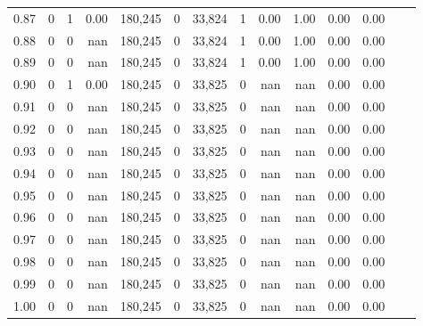 \begin{tabular}{rrrrrrrrrrrrrr}
0.87 &      0 &    1 &    0.00 &  180,245 &        0 &  33,824 &       1 &  0.00 &  1.00 &  0.00 &      0.00 \\
0.88 &      0 &    0 &     nan &  180,245 &        0 &  33,824 &       1 &  0.00 &  1.00 &  0.00 &      0.00 \\
0.89 &      0 &    0 &     nan &  180,245 &        0 &  33,824 &       1 &  0.00 &  1.00 &  0.00 &      0.00 \\
0.90 &      0 &    1 &    0.00 &  180,245 &        0 &  33,825 &       0 &   nan &   nan &  0.00 &      0.00 \\
0.91 &      0 &    0 &     nan &  180,245 &        0 &  33,825 &       0 &   nan &   nan &  0.00 &      0.00 \\
0.92 &      0 &    0 &     nan &  180,245 &        0 &  33,825 &       0 &   nan &   nan &  0.00 &      0.00 \\
0.93 &      0 &    0 &     nan &  180,245 &        0 &  33,825 &       0 &   nan &   nan &  0.00 &      0.00 \\
0.94 &      0 &    0 &     nan &  180,245 &        0 &  33,825 &       0 &   nan &   nan &  0.00 &      0.00 \\
0.95 &      0 &    0 &     nan &  180,245 &        0 &  33,825 &       0 &   nan &   nan &  0.00 &      0.00 \\
0.96 &      0 &    0 &     nan &  180,245 &        0 &  33,825 &       0 &   nan &   nan &  0.00 &      0.00 \\
0.97 &      0 &    0 &     nan &  180,245 &        0 &  33,825 &       0 &   nan &   nan &  0.00 &      0.00 \\
0.98 &      0 &    0 &     nan &  180,245 &        0 &  33,825 &       0 &   nan &   nan &  0.00 &      0.00 \\
0.99 &      0 &    0 &     nan &  180,245 &        0 &  33,825 &       0 &   nan &   nan &  0.00 &      0.00 \\
1.00 &      0 &    0 &     nan &  180,245 &        0 &  33,825 &       0 &   nan &   nan &  0.00 &      0.00 \\
\bottomrule
\end{tabular}
